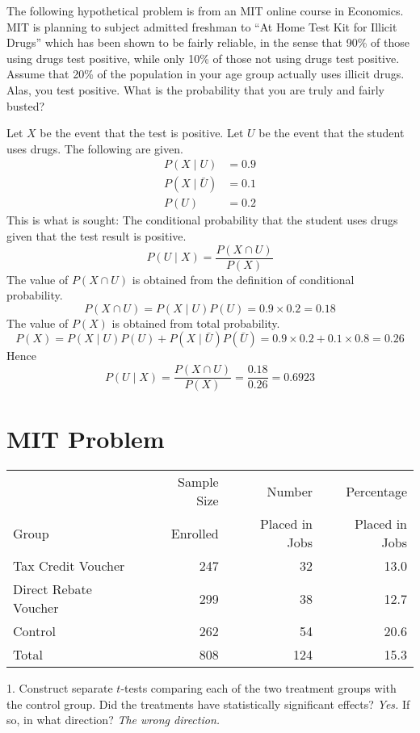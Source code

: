 \documentclass[12pt]{article}
\begin{document}
\newpage

The following hypothetical problem is from an MIT online course in Economics.
MIT is planning to subject admitted freshman to
``At Home Test Kit for Illicit Drugs'' which has been shown to be fairly
reliable, in the sense that 90\% of those using drugs test positive,
while only 10\% of those not using drugs test positive.
Assume that 20\% of the population in your age group actually uses illicit drugs.
Alas, you test positive.
What is the probability that you are truly and fairly busted?

Let $X$ be the event that the test is positive.
Let $U$ be the event that the student uses drugs.
The following are given.
\begin{align*}
P(X\mid U)&=0.9\\
P(X\mid \bar U)&=0.1\\
P(U)&=0.2
\end{align*}
This is what is sought:
The conditional probability that the student
uses drugs given that the test result is positive.
\[
P(U\mid X)=\frac{P(X\cap U)}{P(X)}
\]
The value of $P(X\cap U)$ is obtained from the definition of
conditional probability.
\[
P(X\cap U)=P(X\mid U) P(U)=0.9\times0.2=0.18
\]
The value of $P(X)$ is obtained from total probability.
\[
P(X)=P(X\mid U)P(U)+P(X\mid\bar U)P(\bar U)
=0.9\times0.2+0.1\times0.8=0.26
\]
Hence
\[
P(U\mid X)=\frac{P(X\cap U)}{P(X)}=\frac{0.18}{0.26}=0.6923
\]

\newpage

\section*{MIT Problem}

\begin{center}
\begin{tabular}{lrrr}
\hline
& Sample Size & Number & Percentage\\
Group & Enrolled & Placed in Jobs & Placed in Jobs\\
\hline
Tax Credit Voucher & 247 & 32 & 13.0\\
Direct Rebate Voucher & 299 & 38 & 12.7\\
Control & 262 & 54 & 20.6\\
Total & 808 & 124 & 15.3\\
\hline
\end{tabular}
\end{center}

1. Construct separate $t$-tests comparing each of the two
treatment groups with the control group.
Did the treatments have statistically significant effects? {\it Yes.}
If so, in what direction? {\it The wrong direction.}
\end{document}
